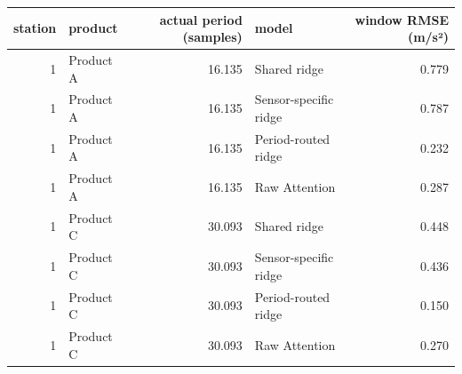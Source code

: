 \begin{tabular}{rlrlr}
\toprule
station & product & actual period (samples) & model & window RMSE (m/s²) \\
\midrule
1 & Product A & 16.135 & Shared ridge & 0.779 \\
1 & Product A & 16.135 & Sensor-specific ridge & 0.787 \\
1 & Product A & 16.135 & Period-routed ridge & 0.232 \\
1 & Product A & 16.135 & Raw Attention & 0.287 \\
1 & Product C & 30.093 & Shared ridge & 0.448 \\
1 & Product C & 30.093 & Sensor-specific ridge & 0.436 \\
1 & Product C & 30.093 & Period-routed ridge & 0.150 \\
1 & Product C & 30.093 & Raw Attention & 0.270 \\
\bottomrule
\end{tabular}
